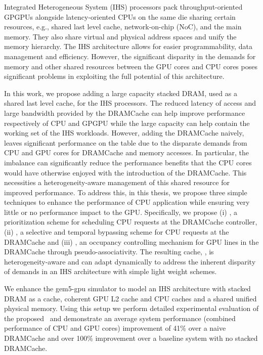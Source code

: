 \par Integrated Heterogeneous System (IHS) processors pack throughput-oriented GPGPUs alongside latency-oriented CPUs on the same die sharing certain resources, e.g., shared last level cache, network-on-chip (NoC), and the main memory. They also share virtual and physical address spaces and unify the memory hierarchy. The IHS architecture allows for easier programmability, data management and efficiency. However, the significant disparity in the demands for memory and other shared resources between the GPU cores and CPU cores poses significant problems in exploiting the full potential of this architecture.
\par In this work, we propose adding a large capacity stacked DRAM, used as a shared last level cache, for the IHS processors. The reduced latency of access and large bandwidth provided by the DRAMCache can help improve performance respectively of CPU and GPGPU while the large capacity can help contain the working set of the IHS workloads. However, adding the DRAMCache naively, leaves significant performance on the table due to the disparate demands from CPU and GPU cores for DRAMCache and memory accesses. 
In particular, the imbalance can significantly reduce the performance benefits that the CPU cores would have otherwise enjoyed with the introduction of the DRAMCache. This necessities a heterogeneity-aware management of this shared resource for improved performance. To address this, in this thesis, we propose three simple techniques to enhance the performance of CPU application while ensuring very little or no performance impact to the GPU. Specifically, we propose (i) \prioname, a prioritization scheme for scheduling CPU
requests at the DRAMCache controller, (ii) \bypassname, a selective and temporal bypassing scheme for CPU requests at the DRAMCache and (iii) \chaining, an occupancy controlling mechanism for GPU lines in the DRAMCache through pseudo-associativity. The resulting cache, \cachename, is heterogeneity-aware and can adapt dynamically to address the inherent disparity of demands in an IHS architecture with simple light weight schemes. 
\par We enhance the gem5-gpu simulator to model an IHS architecture with stacked DRAM as a cache, coherent GPU L2 cache and CPU caches and a shared unified physical memory. Using this setup we perform detailed experimental evaluation of the proposed \cachename\ and demonstrate an average system performance (combined performance of CPU  and GPU cores) improvement of 41\% over a naive DRAMCache and over 100\% improvement over a baseline system with no stacked DRAMCache.
